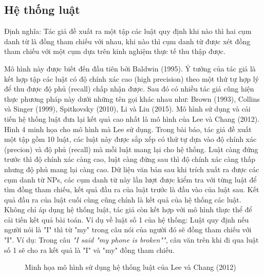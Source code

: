 \documentclass[12pt]{report}
\begin{document}
				\subsection*{Hệ thống luật}
					\par Định nghĩa: Tác giả đề xuất ra một tập các luật quy định khi nào thì hai cụm danh từ là đồng tham chiếu với nhau, khi nào thì cụm danh từ được xét đồng tham chiếu với một cụm dựa trên kinh nghiệm thực tế thu thập được.
					\par Mô hình này được biết đến đầu tiên bởi Baldwin (1995)\cite{baldwin95}. Ý tưởng của tác giả là kết hợp tập các luật có độ chính xác cao (high precision) theo một thứ tự hợp lý để thu được độ phủ (recall) chấp nhận được. Sau đó có nhiều tác giả cũng hiện thực phương pháp này dưới những tên gọi khác nhau như: Brown (1993)\cite{brown93}, Collins và Singer (1999)\cite{collin99}, Spitkovsky (2010)\cite{spitkovsky10}, Li và Liu (2015)\cite{li15}.
					Mô hình sử dụng và cải tiến hệ thống luật đưa lại kết quả cao nhất là mô hình của Lee và Chang (2012)\cite{lee12}. Hình 4 minh họa cho mô hình mà Lee sử dụng. Trong bài báo, tác giả đề xuất một tập gồm 10 luật, các luật này được sắp xếp có thứ tự dựa vào độ chính xác (precion) và độ phủ (recall) mà mỗi luật mang lại cho hệ thống. Luật càng đứng trước thì độ chính xác càng cao, luật càng đứng sau thì độ chính xác càng thấp nhưng độ phủ mang lại càng cao. Dữ liệu văn bản sau khi trích xuất ra được các cụm danh từ NPs, các cụm danh từ này lần lượt được kiểm tra với từng luật để tìm đồng tham chiếu, kết quả đầu ra của luật trước là đầu vào của luật sau. Kết quả đầu ra của luật cuối cùng cũng chính là kết quả của hệ thống các luật. Không chỉ áp dụng hệ thống luật, tác giả còn kết hợp với mô hình thực thể để cải tiến kết quả bài toán. Ví dụ về luật số 1 của hệ thống: Luật quy định nếu người nói là "I" thì từ "my" trong câu nói của người đó sẽ đồng tham chiếu với "I". Ví dụ: Trong câu \textit{"I said "my phone is broken""}, câu văn trên khi đi qua luật số 1 sẽ cho ra kết quả là "I" và "my" đồng tham chiếu.
					\begin{figure}
						\centering
						
						\caption{Minh họa mô hình sử dụng hệ thống luật của Lee và Chang (2012)\cite{lee12}}
					\end{figure}				
\end{document}
